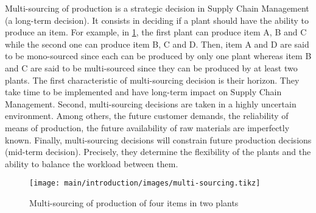 Multi-sourcing of production is a strategic decision in Supply Chain Management (\ie a long-term decision).
It consists in deciding if a plant should have the ability to produce an item.
For example, in \cref{fig:intro:en:multi-sourcing}, the first plant can produce item A, B and C while the second one can produce item B, C and D.
Then, item A and D are said to be mono-sourced since each can be produced by only one plant whereas item B and C are said to be multi-sourced since they can be produced by at least two plants.
The first characteristic of multi-sourcing decision is their horizon.
They take time to be implemented and have long-term impact on Supply Chain Management.
Second, multi-sourcing decisions are taken in a highly uncertain environment.
Among others, the future customer demands, the reliability of means of production, the future availability of raw materials are imperfectly known.
Finally, multi-sourcing decisions will constrain future production decisions (\ie mid-term decision).
Precisely, they determine the flexibility of the plants and the ability to balance the workload between them.


\begin{figure}[!ht]
  \centering
  \texttt{[image: main/introduction/images/multi-sourcing.tikz]}
  \caption{Multi-sourcing of production of four items in two plants}
  \label{fig:intro:en:multi-sourcing}
\end{figure}




